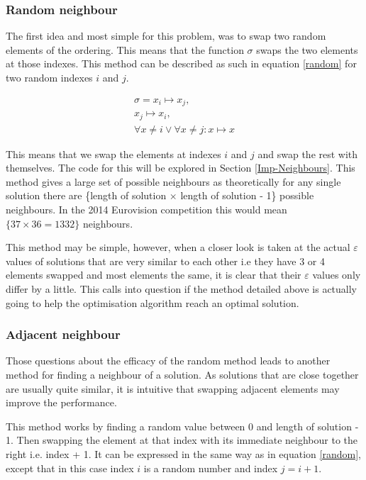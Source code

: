 \documentclass[12pt]{report}
\begin{document}
\subsubsection{Random neighbour}
The first idea and most simple for this problem, was to swap two random elements of the ordering. This means that the function $\sigma$ swaps the two elements at those indexes. This method can be described as such in equation \ref{random} for two random indexes $i$ and $j$.

\begin{equation}\label{random}
\begin{split}
	\sigma = x_i \mapsto x_j,\\ x_j \mapsto x_i,\\ \forall x \neq i \lor \forall x \neq j: x \mapsto x
\end{split}
\end{equation}

This means that we swap the elements at indexes $i$ and $j$ and swap the rest with themselves. The code for this will be explored in Section \ref{Imp-Neighbours}. This method gives a large set of possible neighbours as theoretically for any single solution there are \{length of solution $\times$ length of solution - 1\} possible neighbours. In the 2014 Eurovision competition this would mean $\{37 \times 36 = 1332\}$ neighbours.

This method may be simple, however, when a closer look is taken at the actual $\varepsilon$ values of solutions that are very similar to each other i.e they have 3 or 4 elements swapped and most elements the same, it is clear that their $\varepsilon$ values only differ by a little. This calls into question if the method detailed above is actually going to help the optimisation algorithm reach an optimal solution.

\subsubsection{Adjacent neighbour}
Those questions about the efficacy of the random method leads to another method for finding a neighbour of a solution. As solutions that are close together are usually quite similar, it is intuitive that swapping adjacent elements may improve the performance.

This method works by finding a random value between 0 and length of solution - 1. Then swapping the element at that index with its immediate neighbour to the right i.e. index + 1. It can be expressed in the same way as in equation \ref{random}, except that in this case index $i$ is a random number and index $j = i + 1$.
\end{document}
